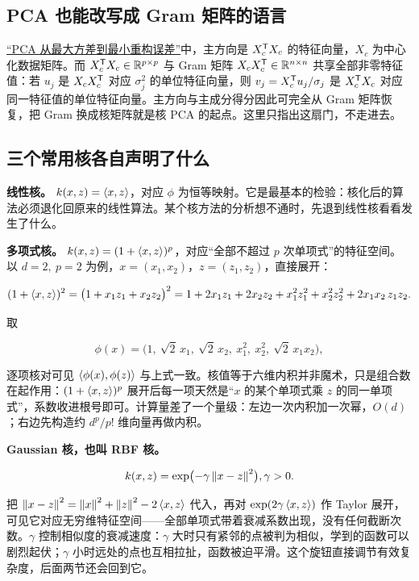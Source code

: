 \subsection{PCA 也能改写成 Gram 矩阵的语言}

\hyperref[sec:13-Machine-Learning/04-Dimensionality-Reduction/01]{``PCA 从最大方差到最小重构误差''}中，主方向是 \(X_c^{\mathsf{T}}X_c\) 的特征向量，\(X_c\) 为中心化数据矩阵。而 \(X_c^{\mathsf{T}}X_c\in\mathbb{R}^{p\times p}\) 与 Gram 矩阵 \(X_cX_c^{\mathsf{T}}\in\mathbb{R}^{n\times n}\) 共享全部非零特征值：若 \(u_j\) 是 \(X_cX_c^{\mathsf{T}}\) 对应 \(\sigma_j^2\) 的单位特征向量，则 \(v_j=X_c^{\mathsf{T}}u_j/\sigma_j\) 是 \(X_c^{\mathsf{T}}X_c\) 对应同一特征值的单位特征向量。主方向与主成分得分因此可完全从 Gram 矩阵恢复，把 Gram 换成核矩阵就是核 PCA 的起点。这里只指出这扇门，不走进去。

\subsection{三个常用核各自声明了什么}

\textbf{线性核。} \(k(x,z)=\left\langle x,z\right\rangle\)，对应 \(\phi\) 为恒等映射。它是最基本的检验：核化后的算法必须退化回原来的线性算法。某个核方法的分析想不通时，先退到线性核看看发生了什么。

\textbf{多项式核。} \(k(x,z)=(1+\left\langle x,z\right\rangle)^{p}\)，对应``全部不超过 \(p\) 次单项式''的特征空间。以 \(d=2,\ p=2\) 为例，\(x=(x_1,x_2)\)，\(z=(z_1,z_2)\)，直接展开：

\[
(1+\left\langle x,z\right\rangle)^{2}
=\bigl(1+x_1z_1+x_2z_2\bigr)^2
=1+2x_1z_1+2x_2z_2+x_1^2z_1^2+x_2^2z_2^2+2x_1x_2\,z_1z_2.
\]

取

\[
\phi(x)=\bigl(1,\ \sqrt2\,x_1,\ \sqrt2\,x_2,\ x_1^2,\ x_2^2,\ \sqrt2\,x_1x_2\bigr),
\]

逐项核对可见 \(\left\langle\phi(x),\phi(z)\right\rangle\) 与上式一致。核值等于六维内积并非魔术，只是组合数在起作用：\((1+\left\langle x,z\right\rangle)^p\) 展开后每一项天然是``\(x\) 的某个单项式乘 \(z\) 的同一单项式''，系数收进根号即可。计算量差了一个量级：左边一次内积加一次幂，\(O(d)\)；右边先构造约 \(d^p/p!\) 维向量再做内积。

\textbf{Gaussian 核，也叫 RBF 核。}

\[
k(x,z)=\exp\bigl(-\gamma\left\lVert x-z\right\rVert^{2}\bigr),\space \gamma>0.
\]

把 \(\left\lVert x-z\right\rVert^{2}=\left\lVert x\right\rVert^{2}+\left\lVert z\right\rVert^{2}-2\left\langle x,z\right\rangle\) 代入，再对 \(\exp(2\gamma\left\langle x,z\right\rangle)\) 作 Taylor 展开，可见它对应无穷维特征空间——全部单项式带着衰减系数出现，没有任何截断次数。\(\gamma\) 控制相似度的衰减速度：\(\gamma\) 大时只有紧邻的点被判为相似，学到的函数可以剧烈起伏；\(\gamma\) 小时远处的点也互相拉扯，函数被迫平滑。这个旋钮直接调节有效复杂度，后面两节还会回到它。

